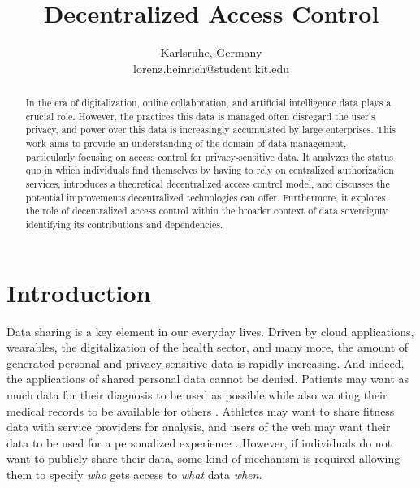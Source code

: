 \documentclass[conference]{IEEEtran}
\begin{document}
\title{Decentralized Access Control}%

\author{
  Karlsruhe, Germany \\
  lorenz.heinrich@student.kit.edu
}

\maketitle

\begin{abstract}
  In the era of digitalization, online collaboration, and artificial intelligence data plays a crucial role.
  However, the practices this data is managed often disregard the user's privacy, and power over this data is increasingly accumulated by large enterprises.
  This work aims to provide an understanding of the domain of data management, particularly focusing on access control for privacy-sensitive data.
  It analyzes the status quo in which individuals find themselves by having to rely on centralized authorization services, introduces a theoretical decentralized access control model, and discusses the potential improvements decentralized technologies can offer.
  Furthermore, it explores the role of decentralized access control within the broader context of data sovereignty identifying its contributions and dependencies.
\end{abstract}

\section{Introduction}
Data sharing is a key element in our everyday lives.
Driven by cloud applications, wearables, the digitalization of the health sector, and many more, the amount of generated personal and privacy-sensitive data is rapidly increasing.
And indeed, the applications of shared personal data cannot be denied.
Patients may want as much data for their diagnosis to be used as possible while also wanting their medical records to be available for others \cite{hollis_share_2016}.
Athletes may want to share fitness data with service providers for analysis, and users of the web may want their data to be used for a personalized experience \cite{nasir_council_nodate}.
However, if individuals do not want to publicly share their data, some kind of mechanism is required allowing them to specify \textit{who} gets access to \textit{what} data \textit{when}.
\end{document}
